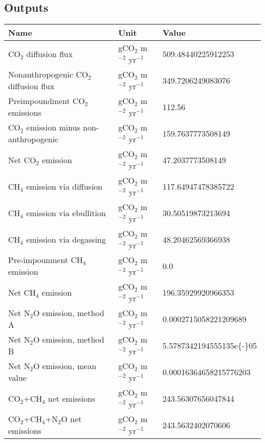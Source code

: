 \documentclass{article}%
\begin{document}
%
\subsection{Outputs}%
\label{subsec:Outputs}%
\begin{center}%
\renewcommand{\arraystretch}{1.0}%
\begin{tabu}{@{}p{10cm} X[c] X[l]@{}}%
\toprule%
\textbf{Name}&\textbf{Unit}&\textbf{Value}\\%
\midrule%
CO$_2$ diffusion flux&gCO$_2$ m$^{-2}$ yr$^{-1}$&\num[round-precision=4,round-mode=figures]{509.48440225912253}\\%
Nonanthropogenic CO$_2$ diffusion flux&gCO$_2$ m$^{-2}$ yr$^{-1}$&\num[round-precision=4,round-mode=figures]{349.7206249083076}\\%
Preimpoundment CO$_2$ emissions&gCO$_2$ m$^{-2}$ yr$^{-1}$&\num[round-precision=4,round-mode=figures]{112.56}\\%
CO$_2$ emission minus non-anthropogenic&gCO$_2$ m$^{-2}$ yr$^{-1}$&\num[round-precision=4,round-mode=figures]{159.7637773508149}\\%
Net CO$_2$ emission&gCO$_2$ m$^{-2}$ yr$^{-1}$&\num[round-precision=4,round-mode=figures]{47.2037773508149}\\%
CH$_4$ emission via diffusion&gCO$_2$ m$^{-2}$ yr$^{-1}$&\num[round-precision=4,round-mode=figures]{117.64947478385722}\\%
CH$_4$ emission via ebullition&gCO$_2$ m$^{-2}$ yr$^{-1}$&\num[round-precision=4,round-mode=figures]{30.50519873213694}\\%
CH$_4$ emission via degassing&gCO$_2$ m$^{-2}$ yr$^{-1}$&\num[round-precision=4,round-mode=figures]{48.20462569366938}\\%
Pre-impounment CH$_4$ emission&gCO$_2$ m$^{-2}$ yr$^{-1}$&\num[round-precision=4,round-mode=figures]{0.0}\\%
Net CH$_4$ emission&gCO$_2$ m$^{-2}$ yr$^{-1}$&\num[round-precision=4,round-mode=figures]{196.35929920966353}\\%
Net N$_2$O emission, method A&gCO$_2$ m$^{-2}$ yr$^{-1}$&\num[round-precision=4,round-mode=figures]{0.0002715058221209689}\\%
Net N$_2$O emission, method B&gCO$_2$ m$^{-2}$ yr$^{-1}$&\num[round-precision=4,round-mode=figures]{5.5787342194555135e{-}05}\\%
Net N$_2$O emission, mean value&gCO$_2$ m$^{-2}$ yr$^{-1}$&\num[round-precision=4,round-mode=figures]{0.00016364658215776203}\\%
\midrule%
CO$_2$+CH$_4$ net emissions&gCO$_2$ m$^{-2}$ yr$^{-1}$&\num[round-precision=4,round-mode=figures]{243.56307656047844}\\%
\midrule%
CO$_2$+CH$_4$+N$_2$O net emissions&gCO$_2$ m$^{-2}$ yr$^{-1}$&\num[round-precision=4,round-mode=figures]{243.5632402070606}\\\bottomrule%
%
\end{tabu}%
\end{center}%
\end{document}
